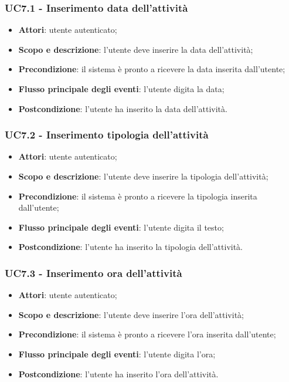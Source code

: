 \subsubsection{UC7.1 - Inserimento data dell’attività }
\begin{itemize}
	\item \textbf{Attori}: utente autenticato;
	\item \textbf{Scopo e descrizione}: l’utente deve inserire la data dell'attività;
	\item \textbf{Precondizione}: il sistema è pronto a ricevere la data inserita dall’utente;
	\item \textbf{Flusso principale degli eventi}: l’utente digita la data;
	\item \textbf{Postcondizione}: l’utente ha inserito la data dell’attività.
\end{itemize}

\subsubsection{UC7.2 - Inserimento tipologia dell’attività}
\begin{itemize}
	\item \textbf{Attori}: utente autenticato;
	\item \textbf{Scopo e descrizione}: l’utente deve inserire la tipologia dell'attività;
	\item \textbf{Precondizione}: il sistema è pronto a ricevere la tipologia inserita dall’utente;
	\item \textbf{Flusso principale degli eventi}: l’utente digita il testo;
	\item \textbf{Postcondizione}: l’utente ha inserito la tipologia dell’attività.
\end{itemize}

\subsubsection{UC7.3 - Inserimento ora dell’attività }
\begin{itemize}
	\item \textbf{Attori}: utente autenticato;
	\item \textbf{Scopo e descrizione}: l’utente deve inserire l'ora dell'attività;
	\item \textbf{Precondizione}: il sistema è pronto a ricevere l'ora inserita dall’utente;
	\item \textbf{Flusso principale degli eventi}: l’utente digita l'ora;
	\item \textbf{Postcondizione}: l’utente ha inserito l'ora dell’attività.
\end{itemize}

